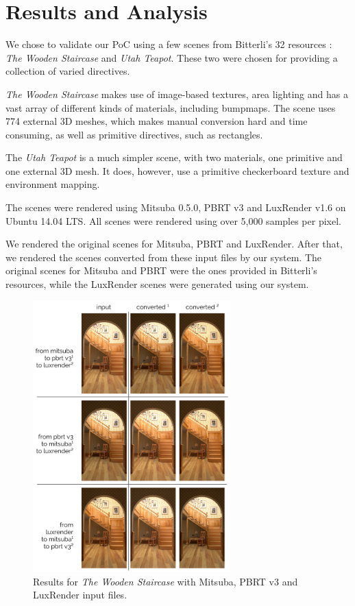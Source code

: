 \section{Results and Analysis}
We chose to validate our PoC using a few scenes from Bitterli's 32 resources 
\cite{resources16}: \textit{The Wooden Staircase} and \textit{Utah Teapot}. 
These two were chosen for providing a collection of varied directives.

\textit{The Wooden Staircase} makes use of image-based textures, area lighting 
and has a vast array of different kinds of materials, including bumpmaps. The 
scene uses 774 external 3D meshes, which makes manual conversion hard and time consuming, as well as primitive directives, such as rectangles.

The \textit{Utah Teapot} is a much simpler scene, with two materials, one primitive  and one 
external 3D mesh. It does, however, use a primitive checkerboard texture and 
environment mapping.

The scenes were rendered using Mitsuba 0.5.0, PBRT v3 and LuxRender v1.6 on 
Ubuntu 14.04 LTS. All scenes were rendered using over 5,000 samples per pixel. 

We rendered the original scenes for Mitsuba, PBRT and LuxRender. After that, we 
rendered the scenes converted from these input files by our system. The original 
scenes for Mitsuba and PBRT were the ones provided in Bitterli's resources, 
while the LuxRender scenes were generated using our system.

\begin{figure}[h]
\centering
\includegraphics[width=3in]{figs/4_results/results_staircase.png}
\caption{Results for \textit{The Wooden Staircase} with Mitsuba, PBRT v3 and 
LuxRender input files.}
\label{fig:staircase}
\end{figure}

